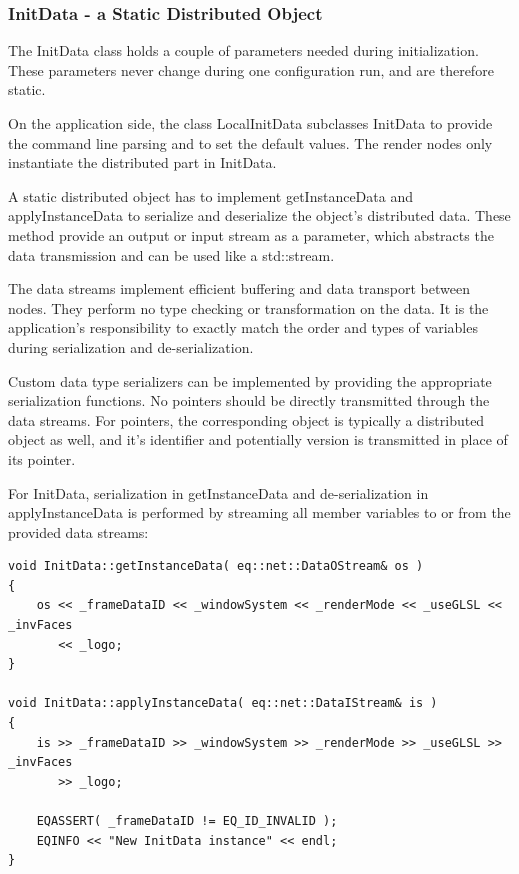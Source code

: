 \documentclass[10pt,a4]{scrartcl}
\begin{document}
\subsubsection{\label{sInitData}InitData - a Static Distributed Object}

The \textsf{InitData} class holds a couple of parameters needed during
initialization. These parameters never change during one configuration
run, and are therefore static.

On the application side, the class \textsf{LocalInitData} subclasses
\textsf{InitData} to provide the command line parsing and to set the
default values. The render nodes only instantiate the distributed part
in \textsf{InitData}.

A static distributed object has to implement \textsf{getInstanceData}
and \textsf{applyInstanceData} to serialize and deserialize the object's
distributed data. These method provide an output or input stream as a
parameter, which abstracts the data transmission and can be used like a
\textsf{std::stream}.

The data streams implement efficient buffering and data transport
between nodes. They perform no type checking or transformation on the
data. It is the application's responsibility to exactly match the order
and types of variables during serialization and de-serialization.

Custom data type serializers can be implemented by providing the
appropriate serialization functions. No pointers should be directly
transmitted through the data streams. For pointers, the corresponding
object is typically a distributed object as well, and it's identifier
and potentially version is transmitted in place of its pointer.

For \textsf{InitData}, serialization in \textsf{getInstanceData}
and de-serialization in \textsf{applyInstanceData} is performed by
streaming all member variables to or from the provided data
streams:

{\footnotesize\begin{lstlisting}
void InitData::getInstanceData( eq::net::DataOStream& os )
{
    os << _frameDataID << _windowSystem << _renderMode << _useGLSL << _invFaces
       << _logo;
}

void InitData::applyInstanceData( eq::net::DataIStream& is )
{
    is >> _frameDataID >> _windowSystem >> _renderMode >> _useGLSL >> _invFaces
       >> _logo;

    EQASSERT( _frameDataID != EQ_ID_INVALID );
    EQINFO << "New InitData instance" << endl;
}
\end{lstlisting}}%
\end{document}
